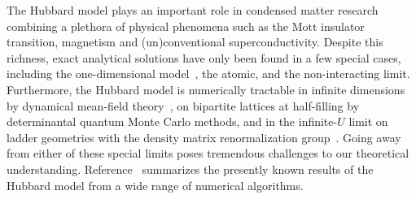 \documentclass[twocolumn,superscriptaddress,pra,showpacs,longbibliography]{revtex4-1}
\newcommand{\<}{\langle}
\renewcommand{\>}{\rangle}
\begin{document}
The Hubbard model plays an important role in condensed matter research combining a plethora of physical phenomena such as the Mott insulator transition, magnetism and (un)conventional superconductivity. Despite this richness, exact analytical solutions have only been found in a few special cases, including the one-dimensional model~\cite{essler2005}, the atomic, and the non-interacting limit. Furthermore, the Hubbard model is numerically tractable in infinite dimensions by dynamical mean-field theory~\cite{Anonymous:z_AfEOwS}, on bipartite lattices at half-filling by determinantal quantum Monte Carlo methods, and in the infinite-$U$ limit on ladder geometries with the density matrix renormalization group~\cite{Liu2011}. Going away from either of these special limits poses tremendous challenges to our theoretical understanding. Reference~\cite{LeBlanc:2015ha} summarizes the presently known results of the Hubbard model from a wide range of numerical algorithms. 
\end{document}
